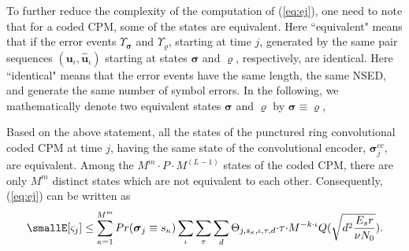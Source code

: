 \documentclass[12pt,twoside,onecolumn,a4paper,english]{IEEEtran2e}
\begin{document}
To further reduce the complexity of the computation of (\ref{eq:ej}), one need to note that for a coded CPM, some of the states are equivalent. Here ``equivalent" means that if the error events $\Upsilon_{\mathbf{\boldsymbol{\sigma}}}$ and
$\Upsilon_{\mathbf{\boldsymbol{\varrho}}}$, starting at time
$j$, generated by the same pair sequences
$(\mathbf{\boldsymbol{u}}_{\iota},\hat{\mathbf{\boldsymbol{u}}}_{\iota})$
starting at states $\mathbf{\boldsymbol{\sigma}}$
 and
$\mathbf{\boldsymbol{\varrho}}$, respectively, are identical.
Here ``identical" means that the error events have the same length,
the same NSED, and generate the same number of symbol errors.
In the following, we mathematically denote two equivalent states $\mathbf{\boldsymbol{\sigma}}$ and
$\mathbf{\boldsymbol{\varrho}}$ by
$\mathbf{\boldsymbol{\sigma}}\equiv{\mathbf{\boldsymbol{\varrho}}}$,


Based on the above statement, all the states of the punctured ring
convolutional coded CPM at time $j$, having the same state of the
convolutional encoder, $\mathbf{\boldsymbol{\sigma}}_j^{cc}$, are
equivalent. Among the $M^m{\cdot}P{\cdot}M^{(L-1)}$ states of the
coded CPM, there are only $M^m$ distinct states which are not
equivalent to each other. Consequently, (\ref{eq:ej}) can be
written
as %
\begin{eqnarray}\label{eq:ejeq1} \small%
E[\varsigma_j]%
\leq
\sum_{\kappa=1}^{M^m}Pr({\mathbf{\boldsymbol{\sigma}}}_j \equiv
s_\kappa)\sum_\iota\sum_\tau\sum_d{\Theta_{j,s_\kappa,\iota,\tau,d}}{\cdot}{\tau}{\cdot}M^{-k{\cdot}\iota} %
Q(\sqrt{d^2\frac{E_sr}{\nu N_0}}).
\end{eqnarray}
%
\end{document}

